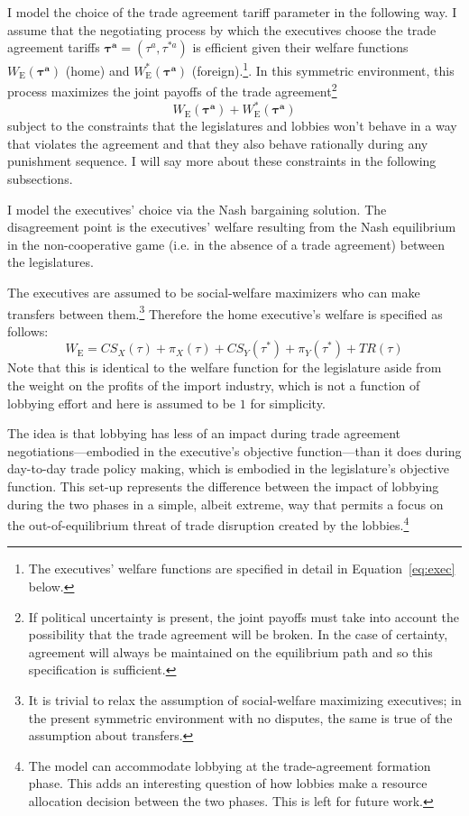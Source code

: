 \documentclass[authoryear, review]{elsarticle}
\newcommand{\bta}{\bm{\tau^a}}
\begin{document}
I model the choice of the trade agreement tariff parameter in the following way. I assume that the negotiating process by which the executives choose the trade agreement tariffs $\bta=\left(\tau^a,\tau^{*a} \right)$ is efficient given their welfare functions $W_\text{E}(\bta)$ (home) and $W_\text{E}^*(\bta)$ (foreign).\footnote{The executives' welfare functions are specified in detail in Equation~\ref{eq:exec} below.}. In this symmetric environment, this process maximizes the joint payoffs of the trade agreement\footnote{If political uncertainty is present, the joint payoffs must take into account the possibility that the trade agreement will be broken. In the case of certainty, agreement will always be maintained on the equilibrium path and so this specification is sufficient.}
\begin{equation}
  W_\text{E}(\bta) + W_\text{E}^*(\bta)
  \label{eq:jv3}
\end{equation}
subject to the constraints that the legislatures and lobbies won't behave in a way that violates the agreement and that they also behave rationally during any punishment sequence. I will say more about these constraints in the following subsections.

I model the executives' choice via the Nash bargaining solution. The disagreement point is the executives' welfare resulting from the Nash equilibrium in the non-cooperative game (i.e. in the absence of a trade agreement) between the legislatures.

The executives are assumed to be social-welfare maximizers who can make transfers between them.\footnote{It is trivial to relax the assumption of social-welfare maximizing executives; in the present symmetric environment with no disputes, the same is true of the assumption about transfers.} Therefore the home executive's welfare is specified as follows:
\begin{equation}
  W_\text{E} = \mathit{CS}_X(\tau) + \pi_X(\tau) + \mathit{CS}_Y(\tau^*) + \pi_Y(\tau^*) + \mathit{TR}(\tau)
	\label{eq:exec}
\end{equation}
Note that this is identical to the welfare function for the legislature aside from the weight on the profits of the import industry, which is not a function of lobbying effort and here is assumed to be $1$ for simplicity. 

The idea is that lobbying has less of an impact during trade agreement negotiations---embodied in the executive's objective function---than it does during day-to-day trade policy making, which is embodied in the legislature's objective function. This set-up represents the difference between the impact of lobbying during the two phases in a simple, albeit extreme, way that permits a focus on the out-of-equilibrium threat of trade disruption created by the lobbies.\footnote{The model can accommodate lobbying at the trade-agreement formation phase. This adds an interesting question of how lobbies make a resource allocation decision between the two phases. This is left for future work.} 
\end{document}
